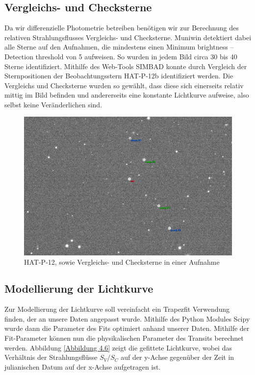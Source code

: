 \documentclass[ngerman,ruledheaders=section,class=report,thesis={type=Protokoll},accentcolor=1b,marginpar=false,parskip=half-,fontsize=11pt,]{tudapub}
\begin{document}
	\subsection{Vergleichs- und Checksterne} \label{Section 4.3.2}
	Da wir differenzielle Photometrie betreiben benötigen wir zur Berechnung des relativen Strahlungsflusses Vergleichs- und Checksterne. Muniwin detektiert dabei alle Sterne auf den Aufnahmen, die mindestens einen \glqq Minimum brightness – Detection threshold \grqq von 5 aufweisen. So wurden in jedem Bild circa 30 bis 40 Sterne identifiziert. Mithilfe des Web-Tools SIMBAD konnte durch Vergleich der Sternpositionen der Beobachtungsstern HAT-P-12b identifiziert werden. Die Vergleichs und Checksterne wurden so gewählt, dass diese sich einerseits relativ mittig im Bild befinden und andererseits eine konstante Lichtkurve aufweise, also selbst keine Veränderlichen sind. \\
	\begin{figure}[h!]
		\centering
		\includegraphics[width=0.8\linewidth]{VarCheckComp_exo.png}
		\caption{HAT-P-12, sowie Vergleichs- und Checksterne in einer Aufnahme}
		\label{Abbildung 4.5}
	\end{figure}
	
	\subsection{Modellierung der Lichtkurve}
	Zur Modellierung der Lichtkurve soll vereinfacht ein Trapezfit Verwendung finden, der an unsere Daten angepasst wurde. Mithilfe des Python Modules Scipy wurde dann die Parameter des Fits optimiert anhand unserer Daten. Mithilfe der Fit-Parameter können nun die physikalischen Parameter des Transits berechnet werden. Abbildung \ref{Abbildung 4.6} zeigt die gefittete Lichtkurve, wobei das Verhältnis der Strahlungsflüsse $S_V / S_C$ auf der y-Achse gegenüber der Zeit in julianischen Datum auf der x-Achse aufgetragen ist. 
	
\end{document}
